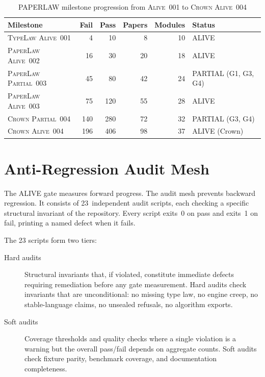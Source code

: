\begin{table}[ht]
\centering
\caption{PAPERLAW milestone progression from \textsc{Alive~001} to \textsc{Crown Alive~004}}
\label{tab:alive-progression}
\begin{tabular}{@{}lrrrrl@{}}
\toprule
\textbf{Milestone} & \textbf{Fail} & \textbf{Pass} & \textbf{Papers} & \textbf{Modules} & \textbf{Status} \\
\midrule
\textsc{TypeLaw Alive~001}    &   4 &  10 &  8  & 10 & ALIVE \\
\textsc{PaperLaw Alive~002}   &  16 &  30 & 20  & 18 & ALIVE \\
\textsc{PaperLaw Partial~003} &  45 &  80 & 42  & 24 & PARTIAL (G1, G3, G4) \\
\textsc{PaperLaw Alive~003}   &  75 & 120 & 55  & 28 & ALIVE \\
\textsc{Crown Partial~004}    & 140 & 280 & 72  & 32 & PARTIAL (G3, G4) \\
\textsc{Crown Alive~004}      & 196 & 406 & 98  & 37 & ALIVE (Crown) \\
\bottomrule
\end{tabular}
\end{table}

\section{Anti-Regression Audit Mesh}
\label{sec:doctrine-audit}

The ALIVE gate measures forward progress. The audit mesh prevents backward regression.
It consists of 23~independent audit scripts, each checking a specific structural invariant
of the repository. Every script exits~0 on pass and exits~1 on fail, printing a named
defect when it fails.

The 23 scripts form two tiers:

\begin{description}
  \item[Hard audits] Structural invariants that, if violated, constitute immediate defects
    requiring remediation before any gate measurement. Hard audits check invariants that
    are unconditional: no missing type law, no engine creep, no stable-language claims,
    no unsealed refusals, no algorithm exports.

  \item[Soft audits] Coverage thresholds and quality checks where a single violation is
    a warning but the overall pass/fail depends on aggregate counts. Soft audits check
    fixture parity, benchmark coverage, and documentation completeness.
\end{description}

